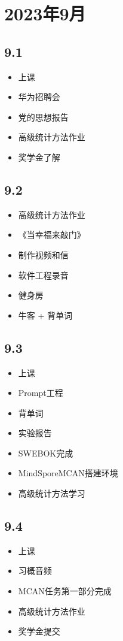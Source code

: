 \documentclass[UTF8]{ctexart}
\begin{document}
\section*{2023年9月}
\subsection*{9.1}
\begin{itemize}
    \item 上课
    \item 华为招聘会
    \item 党的思想报告
    \item 高级统计方法作业
    \item 奖学金了解
\end{itemize}
\subsection*{9.2}
\begin{itemize}
    \item 高级统计方法作业
    \item 《当幸福来敲门》
    \item 制作视频和信
    \item 软件工程录音
    \item 健身房
    \item 牛客 + 背单词
\end{itemize}
\subsection*{9.3}
\begin{itemize}
    \item 上课
    \item Prompt工程
    \item 背单词
    \item 实验报告
    \item SWEBOK完成
    \item MindSporeMCAN搭建环境
    \item 高级统计方法学习
\end{itemize}
\subsection*{9.4}
\begin{itemize}
    \item 上课
    \item 习概音频
    \item MCAN任务第一部分完成
    \item 高级统计方法作业
    \item 奖学金提交
\end{itemize}
\end{document}
